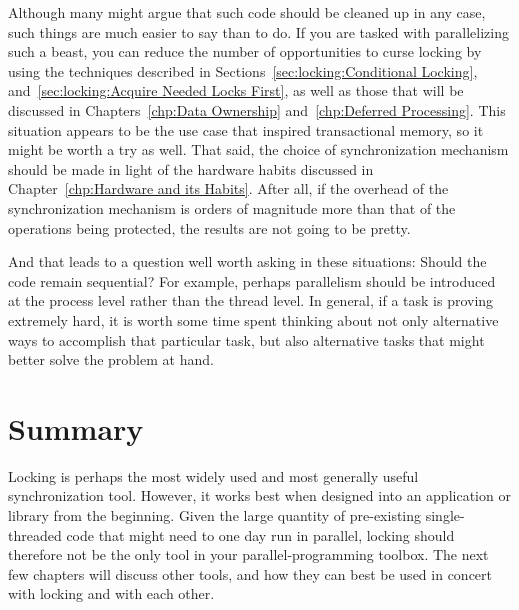 Although many might argue that such code should be cleaned up in any
case, such things are much easier to say than to do.
If you are tasked with parallelizing such a beast, you can reduce the
number of opportunities to curse locking by using the techniques
described in
Sections~\ref{sec:locking:Conditional Locking},
and~\ref{sec:locking:Acquire Needed Locks First},
as well as those that will be discussed in
Chapters~\ref{chp:Data Ownership}
and~\ref{chp:Deferred Processing}.
This situation appears to be the use case that inspired transactional
memory, so it might be worth a try as well.
That said, the choice of synchronization mechanism should be made in
light of the hardware habits discussed in
Chapter~\ref{chp:Hardware and its Habits}.
After all, if the overhead of the synchronization mechanism is orders of
magnitude more than that of the operations being protected, the results
are not going to be pretty.

And that leads to a question well worth asking in these situations:
Should the code remain sequential?
For example, perhaps parallelism should be introduced at the process level
rather than the thread level.
In general, if a task is proving extremely hard, it is worth some time
spent thinking about not only alternative ways to accomplish that
particular task, but also alternative tasks that might better solve
the problem at hand.

\section{Summary}
\label{sec:locking:Summary}

Locking is perhaps the most widely used and most generally useful
synchronization tool.
However, it works best when designed into an application
or library from the beginning.
Given the large quantity of pre-existing single-threaded code that might
need to one day run in parallel, locking should therefore not be the
only tool in your parallel-programming toolbox.
The next few chapters will discuss other tools, and how they can best
be used in concert with locking and with each other.
